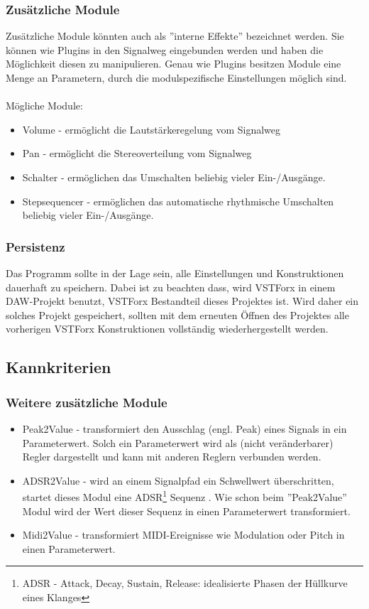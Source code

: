 \subsubsection{Zusätzliche Module}
Zusätzliche Module könnten auch als ''interne Effekte'' bezeichnet werden. Sie können wie Plugins in den Signalweg eingebunden werden und haben die Möglichkeit diesen zu manipulieren. Genau wie Plugins besitzen Module eine Menge an Parametern, durch die modulspezifische Einstellungen möglich sind.\\\\
Mögliche Module:
\begin{itemize}
	\item Volume - ermöglicht die Lautstärkeregelung vom Signalweg
	\item Pan - ermöglicht die Stereoverteilung vom Signalweg
	\item Schalter - ermöglichen das Umschalten beliebig vieler Ein-/Ausgänge.
	\item Stepsequencer - ermöglichen das automatische rhythmische Umschalten beliebig vieler Ein-/Ausgänge.
\end{itemize}

\subsubsection{Persistenz}
Das Programm sollte in der Lage sein, alle Einstellungen und Konstruktionen dauerhaft zu speichern. Dabei ist zu beachten dass, wird VSTForx in einem DAW-Projekt benutzt, VSTForx Bestandteil dieses Projektes ist. Wird daher ein solches Projekt gespeichert, sollten mit dem erneuten Öffnen des Projektes alle vorherigen VSTForx Konstruktionen vollständig wiederhergestellt werden. 
\subsection{Kannkriterien}
\subsubsection{Weitere zusätzliche Module}
\begin{itemize}
	\item Peak2Value - transformiert den Ausschlag (engl. Peak) eines Signals in ein Parameterwert. Solch ein Parameterwert wird als (nicht veränderbarer) Regler dargestellt und kann mit anderen Reglern verbunden werden.
	\item ADSR2Value - wird an einem Signalpfad ein Schwellwert überschritten, startet dieses Modul eine ADSR\footnote{ADSR - Attack, Decay, Sustain, Release: idealisierte Phasen der Hüllkurve eines Klanges} Sequenz . Wie schon beim ''Peak2Value'' Modul wird der Wert dieser Sequenz in einen Parameterwert transformiert.
	\item Midi2Value - transformiert MIDI-Ereignisse wie Modulation oder Pitch in einen Parameterwert.
\end{itemize}

